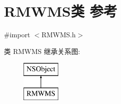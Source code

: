 \hypertarget{interface_r_m_w_m_s}{\section{R\-M\-W\-M\-S类 参考}
\label{interface_r_m_w_m_s}
}


{\ttfamily \#import $<$R\-M\-W\-M\-S.\-h$>$}

类 R\-M\-W\-M\-S 继承关系图\-:\begin{figure}[H]
\begin{center}
\leavevmode
\includegraphics[height=2.000000cm]{interface_r_m_w_m_s}
\end{center}
\end{figure}

